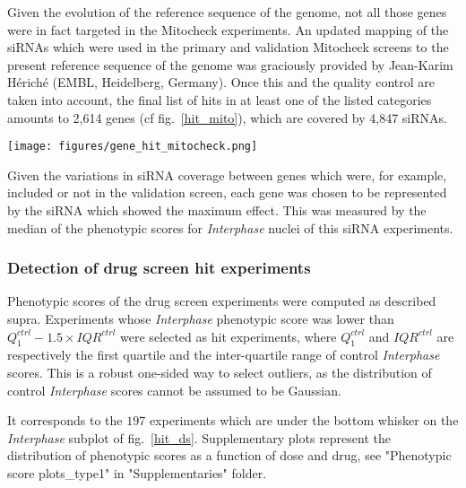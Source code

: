 Given the evolution of the reference sequence of the genome, not all those genes were in fact targeted in the Mitocheck experiments. An updated mapping of the siRNAs which were used in the primary and validation Mitocheck screens to the present reference sequence of the genome was graciously provided by Jean-Karim Hériché (EMBL, Heidelberg, Germany). Once this and the quality control are taken into account, the final list of hits in at least one of the listed categories amounts to 2,614 genes (cf fig.~\ref{hit_mito}), which are covered by 4,847 siRNAs.

\begin{figure*}[ht!]
\centerline{\texttt{[image: figures/gene\_hit\_mitocheck.png]}
}
\caption{Number of hit genes per category. As hit detection is univariate, a gene can be in more than one category.}
\label{hit_mito}
\end{figure*}

Given the variations in siRNA coverage between genes which were, for example, included or not in the validation screen, each gene was chosen to be represented by the siRNA which showed the maximum effect. This was measured by the median of the phenotypic scores for \textit{Interphase} nuclei of this siRNA experiments.


\subsubsection{Detection of drug screen hit experiments}
\label{sec:selection_ds}
Phenotypic scores of the drug screen experiments were computed as described supra. Experiments whose \textit{Interphase} phenotypic score was lower than $Q_1^{ctrl} - 1.5\times IQR^{ctrl}$ were selected as hit experiments, where $Q_1^{ctrl}$ and $IQR^{ctrl}$ are respectively the first quartile and the inter-quartile range of control \textit{Interphase} scores. This is a robust one-sided way to select outliers, as the distribution of control \textit{Interphase} scores cannot be assumed to be Gaussian. 

It corresponds to the $197$ experiments which are under the bottom whisker on the \textit{Interphase} subplot of fig.~\ref{hit_ds}. Supplementary plots represent the distribution of phenotypic scores as a function of dose and drug, see "Phenotypic score plots\_type1" in "Supplementaries" folder.

